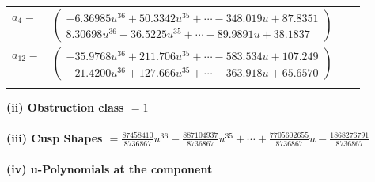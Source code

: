 \documentclass[1p]{elsarticle_modified}
\theoremstyle{definition}
\begin{document}
\begin{tabular}{m{7pt} m{180pt} m{7pt} m{180pt} }
\flushright $a_{4}=$&$\begin{pmatrix}-6.36985 u^{36}+50.3342 u^{35}+\cdots-348.019 u+87.8351\\8.30698 u^{36}-36.5225 u^{35}+\cdots-89.9891 u+38.1837\end{pmatrix}$ \\
\flushright $a_{12}=$&$\begin{pmatrix}-35.9768 u^{36}+211.706 u^{35}+\cdots-583.534 u+107.249\\-21.4200 u^{36}+127.666 u^{35}+\cdots-363.918 u+65.6570\end{pmatrix}$\\&\end{tabular}
\flushleft \textbf{(ii) Obstruction class $= 1$}\\~\\
\flushleft \textbf{(iii) Cusp Shapes $= \frac{87458410}{8736867} u^{36}-\frac{887104937}{8736867} u^{35}+\cdots+\frac{7705602655}{8736867} u-\frac{1868276791}{8736867}$}\\~\\
\newpage\renewcommand{\arraystretch}{1}
\flushleft \textbf{(iv) u-Polynomials at the component}\newline \\
\end{document}
